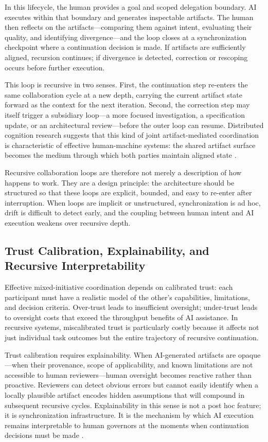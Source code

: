 In this lifecycle, the human provides a goal and scoped delegation boundary. AI executes within that boundary and generates inspectable artifacts. The human then reflects on the artifacts---comparing them against intent, evaluating their quality, and identifying divergence---and the loop closes at a synchronization checkpoint where a continuation decision is made. If artifacts are sufficiently aligned, recursion continues; if divergence is detected, correction or rescoping occurs before further execution.

This loop is recursive in two senses. First, the continuation step re-enters the same collaboration cycle at a new depth, carrying the current artifact state forward as the context for the next iteration. Second, the correction step may itself trigger a subsidiary loop---a more focused investigation, a specification update, or an architectural review---before the outer loop can resume. Distributed cognition research suggests that this kind of joint artifact-mediated coordination is characteristic of effective human-machine systems: the shared artifact surface becomes the medium through which both parties maintain aligned state \cite{Hutchins1995CognitionWild}.

Recursive collaboration loops are therefore not merely a description of how  happens to work. They are a design principle: the architecture should be structured so that these loops are explicit, bounded, and easy to re-enter after interruption. When loops are implicit or unstructured, synchronization is ad hoc, drift is difficult to detect early, and the coupling between human intent and AI execution weakens over recursive depth.

\subsection{Trust Calibration, Explainability, and Recursive Interpretability}

Effective mixed-initiative coordination depends on calibrated trust: each participant must have a realistic model of the other's capabilities, limitations, and decision criteria. Over-trust leads to insufficient oversight; under-trust leads to oversight costs that exceed the throughput benefits of AI assistance. In recursive systems, miscalibrated trust is particularly costly because it affects not just individual task outcomes but the entire trajectory of recursive continuation.

Trust calibration requires explainability. When AI-generated artifacts are opaque---when their provenance, scope of applicability, and known limitations are not accessible to human reviewers---human oversight becomes reactive rather than proactive. Reviewers can detect obvious errors but cannot easily identify when a locally plausible artifact encodes hidden assumptions that will compound in subsequent recursive cycles. Explainability in this sense is not a post hoc feature; it is synchronization infrastructure. It is the mechanism by which AI execution remains interpretable to human governors at the moments when continuation decisions must be made \cite{Shneiderman2020HCAI}.

